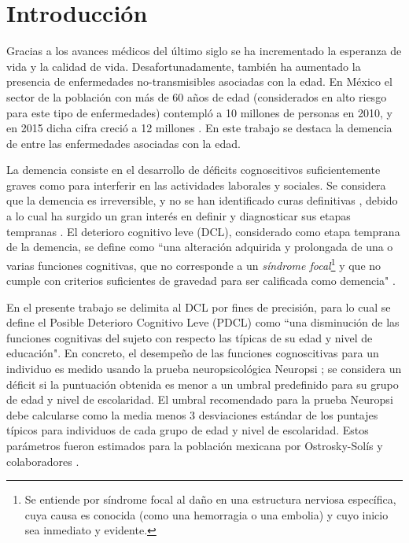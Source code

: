 
\chapter*{Introducción}

Gracias a los avances médicos del último siglo se ha incrementado la esperanza de vida y la calidad de vida. 
%
Desafortunadamente, también ha aumentado la presencia de enfermedades no-transmisibles asociadas con la edad. 
%
En México el sector de la población con más de 60 años de edad (considerados en alto riesgo para este tipo de enfermedades) contempló a 10 millones de personas en 2010, y en 2015 dicha cifra creció a 12 millones \cite{Censo10,Intercensal15}.
%
En este trabajo se destaca la demencia de entre las enfermedades asociadas con la edad.

La demencia consiste en el desarrollo de déficits cognoscitivos suficientemente graves como para interferir en las actividades laborales y sociales.
%
Se considera que la demencia es irreversible, y no se han identificado curas definitivas \cite{PlanAlzheimer04}, debido a lo cual ha surgido un gran interés en definir y diagnosticar sus etapas tempranas \cite{Knopman01}.
%
El deterioro cognitivo leve (DCL), considerado como etapa temprana de la demencia, se define como ``una alteración adquirida y prolongada de una o varias funciones cognitivas, que no corresponde a un \textit{síndrome focal}\footnote{Se entiende por síndrome focal al daño en una estructura nerviosa específica, cuya causa es conocida (como una hemorragia o una embolia) y cuyo inicio sea inmediato y evidente. 
} y que no cumple con criterios suficientes de gravedad para ser calificada como demencia" \cite{Robles02}.

En el presente trabajo se delimita al DCL por fines de precisión, para lo cual se define el Posible Deterioro Cognitivo Leve (PDCL) como ``una disminución de las funciones cognitivas del sujeto con respecto las típicas de su edad y nivel de educación". 
%
En concreto, el desempeño de las funciones cognoscitivas para un individuo es medido usando la prueba neuropsicológica Neuropsi \cite{Ostrosky1999}; se considera un déficit si la puntuación obtenida es menor a un umbral predefinido para su grupo de edad y nivel de escolaridad. 
%
El umbral recomendado para la prueba Neuropsi debe calcularse como la media menos 3 desviaciones estándar de los puntajes típicos para individuos de cada grupo de edad y nivel de escolaridad. 
%
Estos parámetros fueron estimados para la población mexicana por Ostrosky-Solís y colaboradores \cite{Ostrosky1999}.

